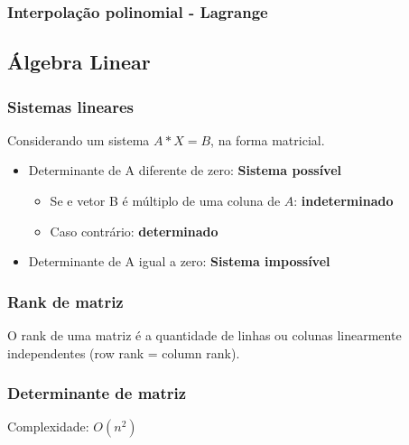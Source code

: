 \divisor

\subsubsection{Interpola\c{c}\~{a}o polinomial - Lagrange}


\subsection{Álgebra Linear}

\subsubsection{Sistemas lineares}
Considerando um sistema $A*X=B$, na forma matricial.
\begin{itemize}
    \item Determinante de A diferente de zero: \textbf{Sistema poss\'{i}vel}
		\begin{itemize}
			\item Se e vetor B \'{e} m\'{u}ltiplo de uma coluna de $A$: \textbf{indeterminado}
			\item Caso contr\'{a}rio: \textbf{determinado}
		\end{itemize}
    \item Determinante de A igual a zero: \textbf{Sistema imposs\'{i}vel}
\end{itemize}

\divisor

\subsubsection{Rank de matriz}
O rank de uma matriz \'{e} a quantidade de linhas ou colunas linearmente independentes (row rank = column  rank).

\divisor

\subsubsection{Determinante de matriz}
Complexidade: $O(n^2)$
\divisor

